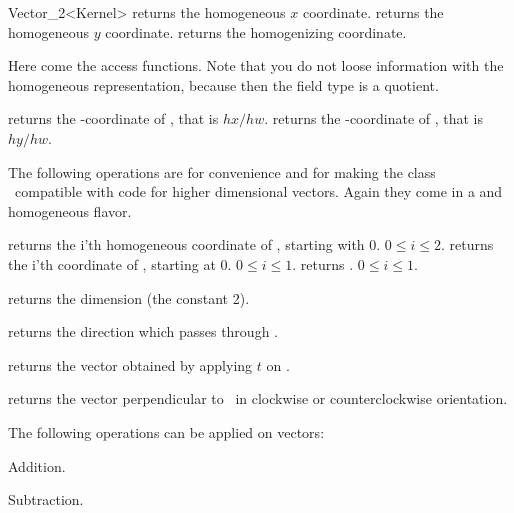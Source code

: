 \begin{ccRefClass} {Vector_2<Kernel>}
       {returns the homogeneous $x$ coordinate.}
\ccGlue
{}
       {returns the homogeneous $y$ coordinate.}
\ccGlue
{}
       {returns the homogenizing  coordinate.}

Here come the  access functions.  Note that you do not loose
information with the homogeneous representation, because then the field
type is a quotient.

       {returns the -coordinate of \ccVar, that is $hx/hw$.}
\ccGlue
{}
       {returns the -coordinate of \ccVar, that is $hy/hw$.}

The following operations are for convenience and for making the
class \ccRefName\ compatible with code for higher dimensional vectors.
Again they come in a  and homogeneous flavor.

       {returns the i'th homogeneous coordinate of \ccVar, starting with 0.
        \ccPrecond $0\leq i \leq 2$.}
\ccGlue
{}
       {returns the i'th  coordinate of \ccVar, starting at 0.
        \ccPrecond $0\leq i \leq 1$.}
\ccGlue
{}
       {returns  .
        \ccPrecond $0\leq i \leq 1$.}

       {returns the dimension (the constant 2).}

       {returns the direction which passes through \ccVar.}

       {returns the vector obtained by applying $t$ on \ccVar.}

       {returns the vector perpendicular to \ccVar\ in clockwise or
        counterclockwise orientation.}


The following operations can be applied on vectors:

       {Addition.}

       {Subtraction.}


\end{ccRefClass}
